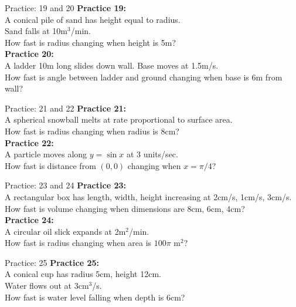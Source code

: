 \documentclass[aspectratio=169]{beamer}
\begin{document}
\begin{frame}{Practice: 19 and 20}
\textbf{Practice 19:} \\
A conical pile of sand has height equal to radius. \\
Sand falls at 10m$^3$/min. \\
How fast is radius changing when height is 5m? \\
\vspace{1em}
\textbf{Practice 20:} \\
A ladder 10m long slides down wall. Base moves at 1.5m/s. \\
How fast is angle between ladder and ground changing when base is 6m from wall?
\end{frame}

\begin{frame}{Practice: 21 and 22}
\textbf{Practice 21:} \\
A spherical snowball melts at rate proportional to surface area. \\
How fast is radius changing when radius is 8cm? \\
\vspace{1em}
\textbf{Practice 22:} \\
A particle moves along $y = \sin x$ at 3 units/sec. \\
How fast is distance from $(0,0)$ changing when $x = \pi/4$?
\end{frame}

\begin{frame}{Practice: 23 and 24}
\textbf{Practice 23:} \\
A rectangular box has length, width, height increasing at 2cm/s, 1cm/s, 3cm/s. \\
How fast is volume changing when dimensions are 8cm, 6cm, 4cm? \\
\vspace{1em}
\textbf{Practice 24:} \\
A circular oil slick expands at 2m$^2$/min. \\
How fast is radius changing when area is $100\pi$ m$^2$?
\end{frame}

\begin{frame}{Practice: 25}
\textbf{Practice 25:} \\
A conical cup has radius 5cm, height 12cm. \\
Water flows out at 3cm$^3$/s. \\
How fast is water level falling when depth is 6cm?
\end{frame}
\end{document}
